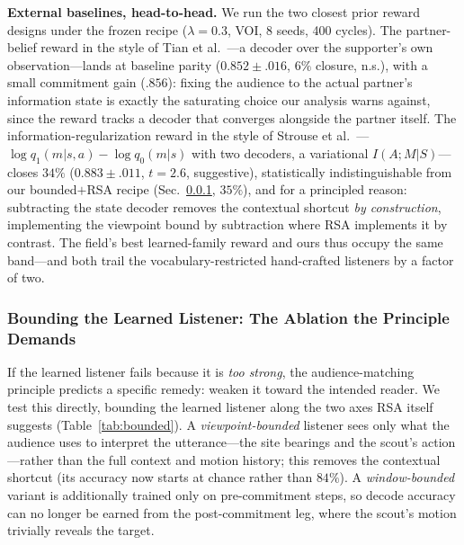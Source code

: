 \documentclass{article}
\begin{document}
\textbf{External baselines, head-to-head.} We run the two closest prior reward designs under the frozen recipe ($\lambda{=}0.3$, VOI, 8 seeds, 400 cycles). The partner-belief reward in the style of Tian et al.~\cite{tian2020implicit}---a decoder over the supporter's own observation---lands at baseline parity ($0.852\pm.016$, $6\%$ closure, n.s.), with a small commitment gain ($.856$): fixing the audience to the actual partner's information state is exactly the saturating choice our analysis warns against, since the reward tracks a decoder that converges alongside the partner itself. The information-regularization reward in the style of Strouse et al.~\cite{strouse2018learning}---$\log q_1(m|s,a) - \log q_0(m|s)$ with two decoders, a variational $I(A;M|S)$---closes $34\%$ ($0.883\pm.011$, $t=2.6$, suggestive), statistically indistinguishable from our bounded$+$RSA recipe (Sec.~\ref{ssec:results_bounded}, $35\%$), and for a principled reason: subtracting the state decoder removes the contextual shortcut \emph{by construction}, implementing the viewpoint bound by subtraction where RSA implements it by contrast. The field's best learned-family reward and ours thus occupy the same band---and both trail the vocabulary-restricted hand-crafted listeners by a factor of two.

\subsubsection{Bounding the Learned Listener: The Ablation the Principle Demands}
\label{ssec:results_bounded}

If the learned listener fails because it is \emph{too strong}, the audience-matching principle predicts a specific remedy: weaken it toward the intended reader. We test this directly, bounding the learned listener along the two axes RSA itself suggests (Table~\ref{tab:bounded}). A \emph{viewpoint-bounded} listener sees only what the audience uses to interpret the utterance---the site bearings and the scout's action---rather than the full context and motion history; this removes the contextual shortcut (its accuracy now starts at chance rather than $84\%$). A \emph{window-bounded} variant is additionally trained only on pre-commitment steps, so decode accuracy can no longer be earned from the post-commitment leg, where the scout's motion trivially reveals the target.
\end{document}

